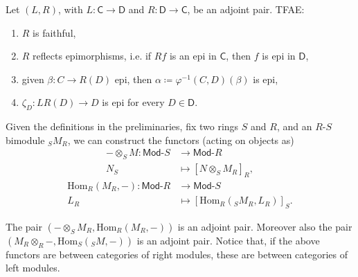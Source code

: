 \begin{rem}[]
	Let $\left(L, R\right)$, with $L\colon \mathsf{C} \to \mathsf{D}$ and $R\colon \mathsf{D} \to \mathsf{C}$, be an adjoint pair.
	TFAE:
	\begin{enumerate}
		\item $R$ is faithful,
		\item $R$ reflects epimorphisms, i.e. if $Rf$ is an epi in $\mathsf{C}$,
			then $f$ is epi in $\mathsf{D}$,
		\item given $\beta\colon C \to R(D)$ epi, then $\alpha \coloneqq \varphi^{-1}(C,D)(\beta)$ is epi,
		\item $\zeta_D\colon LR(D) \to D$ is epi for every $D \in \mathsf{D}$.
	\end{enumerate}
\end{rem}

\begin{rem}[]
	Given the definitions in the preliminaries, fix two rings $S$ and $R$, and an $R$-$S$ bimodule ${}_SM_R$,
	we can construct the functors (acting on objects as)
	\begin{align}
		- \otimes_S M\colon \mathsf{Mod}\text{-}S &\to \mathsf{Mod}\text{-}R \\
		 N_S &\mapsto \left[ N \otimes_S M_R \right]_R
	,\end{align}
	\begin{align}
		\mathrm{Hom}_{R} \left( M_R, - \right)\colon \mathsf{Mod}\text{-}R &\to \mathsf{Mod}\text{-}S \\
		L_R &\mapsto \left[ \mathrm{Hom}_{R}\left( {}_SM_R, L_R \right)\right]_S
	.\end{align} 	
\end{rem}

\begin{prop}\label{prop:tnshomadj}
	The pair $\left(- \otimes_S M_R, \mathrm{Hom}_{R}\left( M_R, - \right)\right)$
	is an adjoint pair.
	Moreover also the pair $\left(M_R \otimes_R -, 
	\mathrm{Hom}_{S}\left( {}_SM, - \right) \right)$ is an adjoint pair.
	Notice that, if the above functors are between categories of right modules,
	these are between categories of left modules.
\end{prop} 

